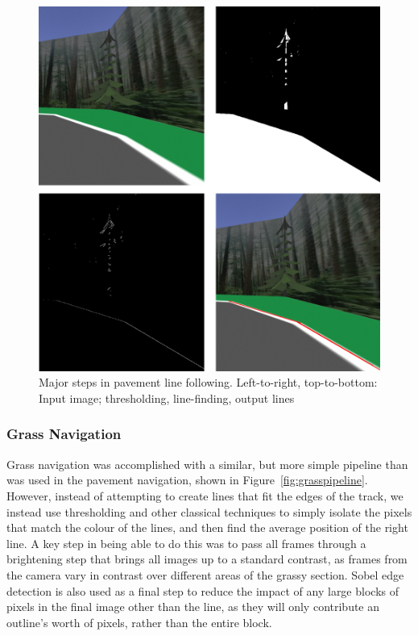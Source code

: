 \documentclass[titlepage, twocolumn]{article}
\begin{document}
            \begin{figure}
                \includegraphics[width=\linewidth]{lines.png}
                \caption{Major steps in pavement line following. Left-to-right, top-to-bottom: Input image; thresholding, line-finding, output lines}
                \label{fig:pants}
            \end{figure}

        \subsubsection{Grass Navigation}

            Grass navigation was accomplished with a similar, but more simple pipeline than was used in the pavement navigation, shown in Figure~\ref{fig:grasspipeline}. However, instead of attempting to create lines that fit the edges of the track, we instead use thresholding and other classical techniques to simply isolate the pixels that match the colour of the lines, and then find the average position of the right line. A key step in being able to do this was to pass all frames through a brightening step that brings all images up to a standard contrast, as frames from the camera vary in contrast over different areas of the grassy section. Sobel edge detection is also used as a final step to reduce the impact of any large blocks of pixels in the final image other than the line, as they will only contribute an outline's worth of pixels, rather than the entire block. 
\end{document}
